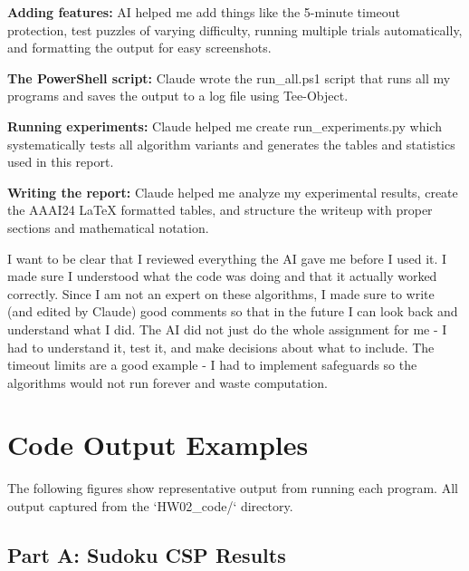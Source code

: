 \documentclass[letterpaper]{article}
\begin{document}
\textbf{Adding features:} AI helped me add things like the 5-minute timeout protection, test puzzles of varying difficulty, running multiple trials automatically, and formatting the output for easy screenshots.

\textbf{The PowerShell script:} Claude wrote the run\_all.ps1 script that runs all my programs and saves the output to a log file using Tee-Object.

\textbf{Running experiments:} Claude helped me create run\_experiments.py which systematically tests all algorithm variants and generates the tables and statistics used in this report.

\textbf{Writing the report:} Claude helped me analyze my experimental results, create the AAAI24 LaTeX formatted tables, and structure the writeup with proper sections and mathematical notation.

I want to be clear that I reviewed everything the AI gave me before I used it. I made sure I understood what the code was doing and that it actually worked correctly. Since I am not an expert on these algorithms, I made sure to write (and edited by Claude) good comments so that in the future I can look back and understand what I did. The AI did not just do the whole assignment for me - I had to understand it, test it, and make decisions about what to include. The timeout limits are a good example - I had to implement safeguards so the algorithms would not run forever and waste computation.

\section{Code Output Examples}

The following figures show representative output from running each program. All output captured from the `HW02\_code/` directory.

\subsection{Part A: Sudoku CSP Results}
\end{document}
